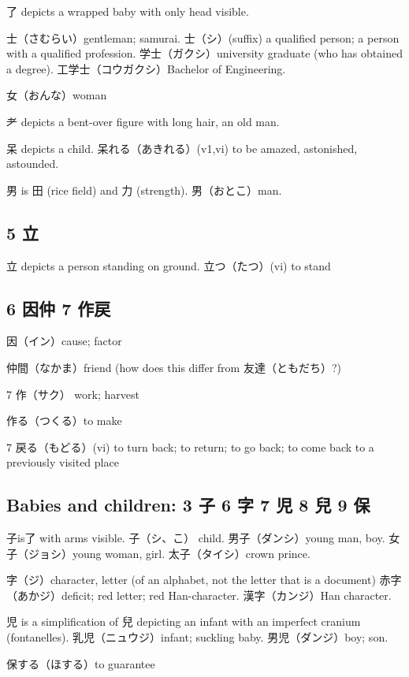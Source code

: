 了 depicts a wrapped baby with only head visible.

士（さむらい）gentleman; samurai.
士（シ）(suffix)
a qualified person;
a person with a qualified profession.
学士（ガクシ）university graduate (who has obtained a degree).
工学士（コウガクシ）Bachelor of Engineering.

女（おんな）woman

耂 depicts a bent-over figure with long hair, an old man.

呆 depicts a child.
呆れる（あきれる）(v1,vi) to be amazed, astonished, astounded.

男 is 田 (rice field) and 力 (strength).
男（おとこ）man.

\subsection{5 立}

立 depicts a person standing on ground.
立つ（たつ）(vi) to stand

\subsection{6 因仲 7 作戻}

因（イン）cause; factor

仲間（なかま）friend (how does this differ from 友達（ともだち）?)

7 作（サク） work; harvest

作る（つくる）to make

7 戻る（もどる）(vi) to turn back; to return; to go back;
to come back to a previously visited place

\subsection{Babies and children: 3 子 6 字 7 児 8 兒 9 保}

子is了 with arms visible.
子（シ、こ） child.
男子（ダンシ）young man, boy.
女子（ジョシ）young woman, girl.
太子（タイシ）crown prince.

字（ジ）character, letter (of an alphabet, not the letter that is a document)
赤字（あかジ）deficit; red letter; red Han-character.
漢字（カンジ）Han character.

児 is a simplification of 兒 depicting an infant
with an imperfect cranium (fontanelles).
乳児（ニュウジ）infant; suckling baby.
男児（ダンジ）boy; son.

保する（ほする）to guarantee

